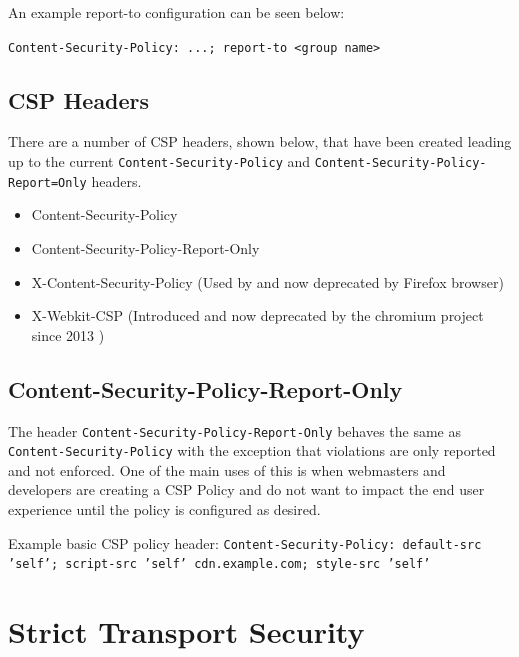 \documentclass{mscreport}
\begin{document}
\vspace{0.3cm} \noindent
An example report-to configuration can be seen below:

\vspace{0.3cm} \noindent
\texttt{Content-Security-Policy: ...; report-to <group name>}

\subsection{CSP Headers}

There are a number of CSP headers, shown below, that have been created leading up to the current \texttt{Content-Security-Policy} and \texttt{Content-Security-Policy-Report=Only} headers.

\begin{itemize}
  \setlength\itemsep{0.1em}
  \item Content-Security-Policy
  \item Content-Security-Policy-Report-Only
  \item X-Content-Security-Policy (Used by and now deprecated by Firefox browser)
  \item X-Webkit-CSP (Introduced and now deprecated by the chromium project since 2013 \cite{Google_undated-ct})
\end{itemize}


\subsection{Content-Security-Policy-Report-Only}

The header \texttt{Content-Security-Policy-Report-Only} behaves the same as \newline \texttt{Content-Security-Policy} with the exception that violations are only reported and not enforced. One of the main uses of this is when webmasters and developers are creating a CSP Policy and do not want to impact the end user experience until the policy is configured as desired.

\vspace{0.5cm} \noindent
Example basic CSP policy header: \texttt{Content-Security-Policy: default-src 'self'; script-src 'self' cdn.example.com; style-src 'self'}

\section{Strict Transport Security}
\label{section:bg_STS}
\end{document}

